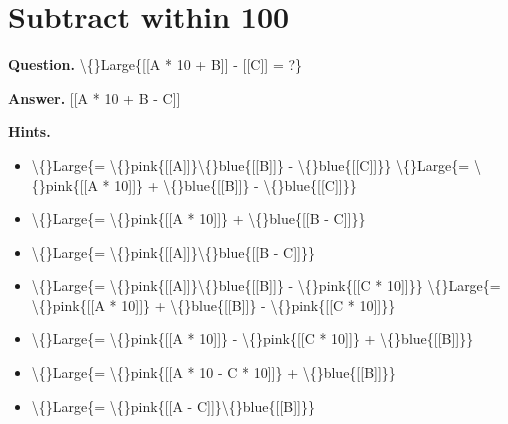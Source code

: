 \documentclass{article}
\begin{document}
\section*{Subtract within 100}
\textbf{Question.} \textbackslash\{\}Large\{[[A * 10 + B]] - [[C]] = ?\}

\textbf{Answer.} [[A * 10 + B - C]]

\textbf{Hints.}
\begin{itemize}
  \item \textbackslash\{\}Large\{= \textbackslash\{\}pink\{[[A]]\}\textbackslash\{\}blue\{[[B]]\} - \textbackslash\{\}blue\{[[C]]\}\}
                        \textbackslash\{\}Large\{= \textbackslash\{\}pink\{[[A * 10]]\} + \textbackslash\{\}blue\{[[B]]\} - \textbackslash\{\}blue\{[[C]]\}\}
  \item \textbackslash\{\}Large\{= \textbackslash\{\}pink\{[[A * 10]]\} + \textbackslash\{\}blue\{[[B - C]]\}\}
  \item \textbackslash\{\}Large\{= \textbackslash\{\}pink\{[[A]]\}\textbackslash\{\}blue\{[[B - C]]\}\}
  \item \textbackslash\{\}Large\{= \textbackslash\{\}pink\{[[A]]\}\textbackslash\{\}blue\{[[B]]\} - \textbackslash\{\}pink\{[[C * 10]]\}\}
                        \textbackslash\{\}Large\{= \textbackslash\{\}pink\{[[A * 10]]\} + \textbackslash\{\}blue\{[[B]]\} - \textbackslash\{\}pink\{[[C * 10]]\}\}
  \item \textbackslash\{\}Large\{= \textbackslash\{\}pink\{[[A * 10]]\} - \textbackslash\{\}pink\{[[C * 10]]\} + \textbackslash\{\}blue\{[[B]]\}\}
  \item \textbackslash\{\}Large\{= \textbackslash\{\}pink\{[[A * 10 - C * 10]]\} + \textbackslash\{\}blue\{[[B]]\}\}
  \item \textbackslash\{\}Large\{= \textbackslash\{\}pink\{[[A - C]]\}\textbackslash\{\}blue\{[[B]]\}\}
\end{itemize}
\end{document}
